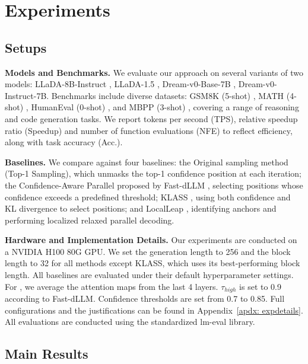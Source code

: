 \section{Experiments}

\subsection{Setups}
\noindent \textbf{Models and Benchmarks.} We evaluate our approach on several variants of two models: LLaDA-8B-Instruct \cite{llada}, LLaDA-1.5 \cite{llada1.5}, Dream-v0-Base-7B \cite{dream}, Dream-v0-Instruct-7B. Benchmarks include diverse datasets: GSM8K (5-shot) \cite{gsm8k}, MATH (4-shot) \cite{math}, HumanEval (0-shot) \cite{humaneval}, and MBPP (3-shot) \cite{mbpp}, covering a range of reasoning and code generation tasks. 
We report tokens per second (TPS), relative speedup ratio (Speedup) and number of function evaluations (NFE) to reflect efficiency, along with task accuracy (Acc.).

\noindent \textbf{Baselines.} We compare \dawn{} against four baselines: the Original sampling method (Top-1 Sampling), which unmasks the top-1 confidence position at each iteration; the Confidence-Aware Parallel proposed by Fast-dLLM \cite{fastdllm}, selecting positions whose confidence exceeds a predefined threshold; KLASS \cite{klass}, using both confidence and KL divergence to select positions; and LocalLeap \cite{localleap}, identifying anchors and performing localized relaxed parallel decoding. 

\noindent \textbf{Hardware and Implementation Details.} Our experiments are conducted on a NVIDIA H100 80G GPU. We set the generation length to 256 and the block length to 32 for all methods except KLASS, which uses its best-performing block length. All baselines are evaluated under their default hyperparameter settings. For \dawn{}, we average the attention maps from the last 4 layers. $\tau_{high}$ is set to 0.9 according to Fast-dLLM. Confidence thresholds are set from 0.7 to 0.85. Full configurations and the justifications can be found in Appendix~\ref{apdx: expdetails}. All evaluations are conducted using the standardized lm-eval \cite{lm-eval} library. 

\subsection{Main Results}

